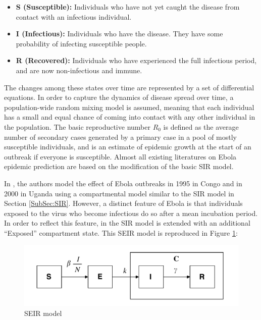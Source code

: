 \documentclass[10pt, journal,onecolumn]{IEEEtran}
\begin{document}
\begin{itemize}
\item \textbf{S (Susceptible):} Individuals who have not yet caught the disease from contact with an infectious
  individual.
\item \textbf{I (Infectious):} Individuals who have the disease. They have some probability of
  infecting susceptible people.
\item \textbf{R (Recovered):} Individuals who have experienced the full infectious period, and are
  now non-infectious and immune.
\end{itemize}

The changes among these states over time are represented by a set of differential equations. In
order to capture the dynamics of disease spread over time, a population-wide random mixing model is
assumed, meaning that each individual has a small and equal chance of coming into contact with
any other individual in the population. The basic reproductive number $R_0$
is defined as the average number of secondary cases generated by a primary case in a pool of mostly
susceptible individuals, and is an estimate of epidemic growth at the start of an outbreak if
everyone is susceptible. Almost all existing literatures \citep{chowell2004basic,legrand2007understanding,gomes2014assessing} on Ebola epidemic prediction are based on the modification of the basic SIR model.

In \citep{chowell2004basic}, the authors model the effect of Ebola outbreaks in 1995 in Congo and in
2000 in Uganda using a compartmental model similar to the SIR model in Section \ref{SubSec:SIR}. However, a
distinct feature of Ebola is that individuals exposed to the virus who become infectious do so
after a mean incubation period. In order to reflect this feature, in the SIR model is extended with
an additional ``Exposed'' compartment state. This SEIR model is reproduced in
Figure \ref{fig:SEIR_model}:

\begin{figure}[h!]
\captionsetup{justification=centering}
\includegraphics[scale=0.4]{seir_model_fig}
\centering\caption{SEIR model}
\label{fig:SEIR_model}
\end{figure}
\end{document}
